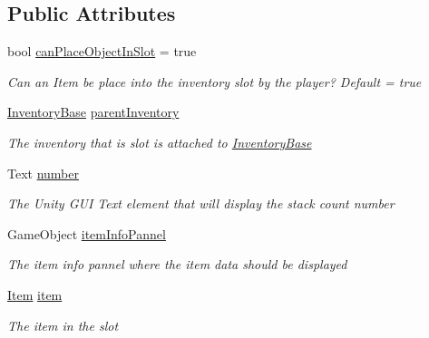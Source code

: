 \subsection*{Public Attributes}
\begin{DoxyCompactItemize}
\item 
bool \hyperlink{class_bee_game_1_1_inventory_1_1_inventory_slot_a249f89b637bf8cdb83785b68ce617b4c}{can\+Place\+Object\+In\+Slot} = true
\begin{DoxyCompactList}\small\item\em Can an Item be place into the inventory slot by the player? Default = true \end{DoxyCompactList}\item 
\hyperlink{class_bee_game_1_1_inventory_1_1_inventory_base}{Inventory\+Base} \hyperlink{class_bee_game_1_1_inventory_1_1_inventory_slot_a06c37b35f2512ee2f0652a93129808e4}{parent\+Inventory}
\begin{DoxyCompactList}\small\item\em The inventory that is slot is attached to \hyperlink{class_bee_game_1_1_inventory_1_1_inventory_base}{Inventory\+Base} \end{DoxyCompactList}\item 
Text \hyperlink{class_bee_game_1_1_inventory_1_1_inventory_slot_adbdcece869818ee00193cf27bd9f46d4}{number}
\begin{DoxyCompactList}\small\item\em The Unity G\+UI Text element that will display the stack count number \end{DoxyCompactList}\item 
Game\+Object \hyperlink{class_bee_game_1_1_inventory_1_1_inventory_slot_aa45b9de343c847b7c8d7db4163f765ec}{item\+Info\+Pannel}
\begin{DoxyCompactList}\small\item\em The item info pannel where the item data should be displayed \end{DoxyCompactList}\item 
\hyperlink{struct_bee_game_1_1_items_1_1_item}{Item} \hyperlink{class_bee_game_1_1_inventory_1_1_inventory_slot_a31b201e7eef9ed0001a447b3f76a7a81}{item}
\begin{DoxyCompactList}\small\item\em The item in the slot \end{DoxyCompactList}\end{DoxyCompactItemize}
